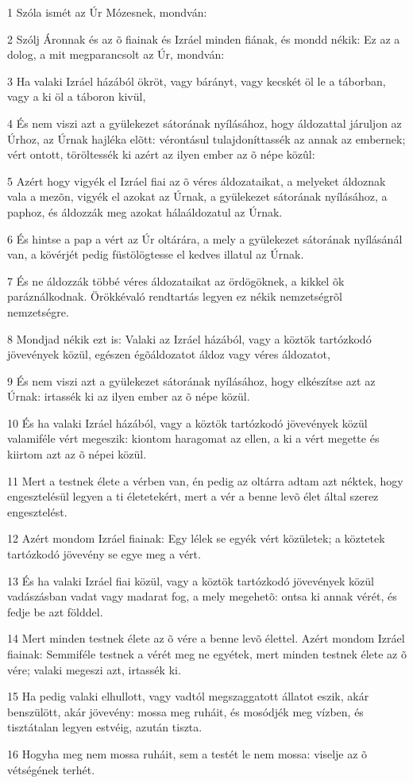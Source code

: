 \par 1 Szóla ismét az Úr Mózesnek, mondván:
\par 2 Szólj Áronnak és az õ fiainak és Izráel minden fiának, és mondd nékik: Ez az a dolog, a mit megparancsolt az Úr, mondván:
\par 3 Ha valaki Izráel házából ökröt, vagy bárányt, vagy kecskét öl le a táborban, vagy a ki öl a táboron kivül,
\par 4 És nem viszi azt a gyülekezet sátorának nyílásához, hogy áldozattal járuljon az Úrhoz, az Úrnak hajléka elõtt: vérontásul tulajdoníttassék az annak az embernek; vért ontott, töröltessék ki azért az ilyen ember az õ népe közûl:
\par 5 Azért hogy vigyék el Izráel fiai az õ véres áldozataikat, a melyeket áldoznak vala a mezõn, vigyék el azokat az Úrnak, a gyülekezet sátorának nyílásához, a paphoz, és áldozzák meg azokat hálaáldozatul az Úrnak.
\par 6 És hintse a pap a vért az Úr oltárára, a mely a gyülekezet sátorának nyílásánál van, a kövérjét pedig füstölögtesse el kedves illatul az Úrnak.
\par 7 És ne áldozzák többé véres áldozataikat az ördögöknek, a kikkel õk paráználkodnak. Örökkévaló rendtartás legyen ez nékik nemzetségrõl nemzetségre.
\par 8 Mondjad nékik ezt is: Valaki az Izráel házából, vagy a köztök tartózkodó jövevények közül, egészen égõáldozatot áldoz vagy véres áldozatot,
\par 9 És nem viszi azt a gyülekezet sátorának nyílásához, hogy elkészítse azt az Úrnak: irtassék ki az ilyen ember az õ népe közül.
\par 10 És ha valaki Izráel házából, vagy a köztök tartózkodó jövevények közül valamiféle vért megeszik: kiontom haragomat az ellen, a ki a vért megette és kiirtom azt az õ népei közül.
\par 11 Mert a testnek élete a vérben van, én pedig az oltárra  adtam azt néktek, hogy engesztelésül legyen a ti életetekért, mert a vér a benne levõ élet által szerez engesztelést.
\par 12 Azért mondom Izráel fiainak: Egy lélek se egyék vért közületek; a köztetek tartózkodó jövevény se egye meg a vért.
\par 13 És ha valaki Izráel fiai közül, vagy a köztök tartózkodó jövevények közül vadászásban vadat vagy madarat fog, a mely megehetõ: ontsa ki annak vérét, és fedje be azt földdel.
\par 14 Mert minden testnek élete az õ vére a benne levõ élettel. Azért mondom Izráel fiainak: Semmiféle testnek a vérét meg ne egyétek, mert minden testnek élete az õ vére; valaki megeszi azt, irtassék ki.
\par 15 Ha pedig valaki elhullott, vagy vadtól megszaggatott állatot eszik, akár benszülött, akár jövevény: mossa meg ruháit, és mosódjék meg vízben, és tisztátalan legyen estvéig, azután tiszta.
\par 16 Hogyha meg nem mossa ruháit, sem a testét le nem mossa: viselje az õ vétségének terhét.

